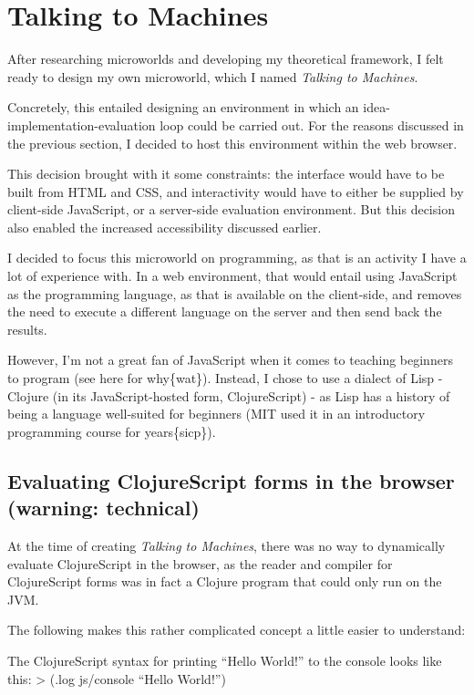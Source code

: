\section{Talking to Machines}

After researching microworlds and developing my theoretical framework, I
felt ready to design my own microworld, which I named \emph{Talking to
Machines}.

Concretely, this entailed designing an environment in which an
idea-implementation-evaluation loop could be carried out. For the
reasons discussed in the previous section, I decided to host this
environment within the web browser.

This decision brought with it some constraints: the interface would have
to be built from HTML and CSS, and interactivity would have to either be
supplied by client-side JavaScript, or a server-side evaluation
environment. But this decision also enabled the increased accessibility
discussed earlier.

I decided to focus this microworld on programming, as that is an
activity I have a lot of experience with. In a web environment, that
would entail using JavaScript as the programming language, as that is
available on the client-side, and removes the need to execute a
different language on the server and then send back the results.

However, I'm not a great fan of JavaScript when it comes to teaching
beginners to program (see here for why\{wat\}). Instead, I chose to use
a dialect of Lisp - Clojure (in its JavaScript-hosted form,
ClojureScript) - as Lisp has a history of being a language well-suited
for beginners (MIT used it in an introductory programming course for
years\{sicp\}).

\subsection{Evaluating ClojureScript forms in the browser (warning:
technical)}

At the time of creating \emph{Talking to Machines}, there was no way to
dynamically evaluate ClojureScript in the browser, as the reader and
compiler for ClojureScript forms was in fact a Clojure program that
could only run on the JVM.

The following makes this rather complicated concept a little easier to
understand:

The ClojureScript syntax for printing ``Hello World!'' to the console
looks like this: \textgreater{} (.log js/console ``Hello World!'')

